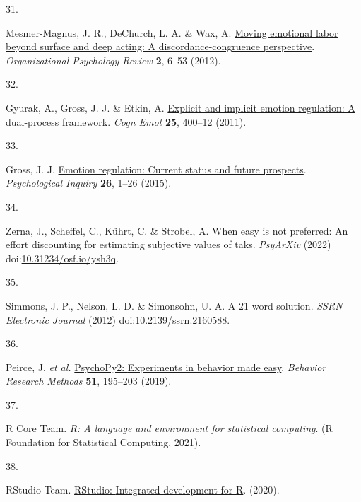 \documentclass[
  man,floatsintext]{apa6}
\newlength{\cslhangindent}
\newlength{\csllabelwidth}
\newlength{\cslentryspacingunit} %
\newenvironment{CSLReferences}[2] %
 {%
  \setlength{\parindent}{0pt}
  \ifodd #1
  \let\oldpar\par
  \def\par{\hangindent=\cslhangindent\oldpar}
  \fi
  \setlength{\parskip}{#2\cslentryspacingunit}
 }%
 {}
\newcommand{\CSLLeftMargin}[1]{\parbox[t]{\csllabelwidth}{#1}}
\newcommand{\CSLRightInline}[1]{\parbox[t]{\linewidth - \csllabelwidth}{#1}\break}
\begin{document}
\begin{CSLReferences}{0}{0}
\leavevmode{}%
\CSLLeftMargin{31. }%
\CSLRightInline{Mesmer-Magnus, J. R., DeChurch, L. A. \& Wax, A. \href{https://doi.org/10.1177/2041386611417746}{Moving emotional labor beyond surface and deep acting: A discordance-congruence perspective}. \emph{Organizational Psychology Review} \textbf{2}, 6--53 (2012).}

\leavevmode{}%
\CSLLeftMargin{32. }%
\CSLRightInline{Gyurak, A., Gross, J. J. \& Etkin, A. \href{https://doi.org/10.1080/02699931.2010.544160}{Explicit and implicit emotion regulation: A dual-process framework}. \emph{Cogn Emot} \textbf{25}, 400--12 (2011).}

\leavevmode{}%
\CSLLeftMargin{33. }%
\CSLRightInline{Gross, J. J. \href{https://doi.org/10.1080/1047840x.2014.940781}{Emotion regulation: Current status and future prospects}. \emph{Psychological Inquiry} \textbf{26}, 1--26 (2015).}

\leavevmode{}%
\CSLLeftMargin{34. }%
\CSLRightInline{Zerna, J., Scheffel, C., Kührt, C. \& Strobel, A. When easy is not preferred: An effort discounting for estimating subjective values of taks. \emph{PsyArXiv} (2022) doi:\href{https://doi.org/10.31234/osf.io/ysh3q}{10.31234/osf.io/ysh3q}.}

\leavevmode{}%
\CSLLeftMargin{35. }%
\CSLRightInline{Simmons, J. P., Nelson, L. D. \& Simonsohn, U. A. A 21 word solution. \emph{SSRN Electronic Journal} (2012) doi:\href{https://doi.org/10.2139/ssrn.2160588}{10.2139/ssrn.2160588}.}

\leavevmode{}%
\CSLLeftMargin{36. }%
\CSLRightInline{Peirce, J. \emph{et al.} \href{https://doi.org/10.3758/s13428-018-01193-y}{{PsychoPy2}: {Experiments} in behavior made easy}. \emph{Behavior Research Methods} \textbf{51}, 195--203 (2019).}

\leavevmode{}%
\CSLLeftMargin{37. }%
\CSLRightInline{R Core Team. \emph{\href{https://www.R-project.org/}{R: A language and environment for statistical computing}}. (R Foundation for Statistical Computing, 2021).}

\leavevmode{}%
\CSLLeftMargin{38. }%
\CSLRightInline{RStudio Team. \href{http://www.rstudio.com}{{RStudio}: {Integrated} development for {R}}. (2020).}


\end{CSLReferences}
\end{document}
